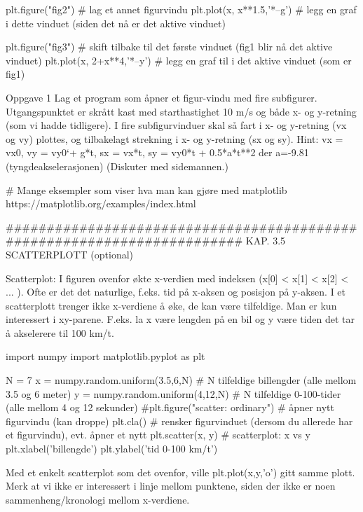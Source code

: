 \documentclass[a4paper,11pt,utf8]{book}
\begin{document}
plt.figure("fig2")                     # lag et annet figurvindu
plt.plot(x, x**1.5,'*--g')             # legg en graf i dette vinduet (siden det nå er det aktive vinduet)

plt.figure("fig3")                     # skift tilbake til det første vinduet (fig1 blir nå det aktive vinduet)
plt.plot(x, 2+x**4,'*--y')             # legg en graf til i det aktive vinduet (som er fig1)




Oppgave 1
Lag et program som åpner et figur-vindu med fire subfigurer.
Utgangspunktet er skrått kast med starthastighet 10 m/s og både x- og y-retning (som vi hadde tidligere).
I fire subfigurvinduer skal så fart i x- og y-retning (vx og vy) plottes,
og tilbakelagt strekning i x- og y-retning (sx og sy). 
Hint: vx = vx0, vy = vy0`+ g*t, sx = vx*t, sy = vy0*t + 0.5*a*t**2  der a=-9.81 (tyngdeakselerasjonen)
(Diskuter med sidemannen.) 



# Mange eksempler som viser hva man kan gjøre med matplotlib
https://matplotlib.org/examples/index.html


######################################################################## 
KAP. 3.5  SCATTERPLOTT  (optional)

Scatterplot:
I figuren ovenfor økte x-verdien med indeksen (x[0] < x[1] < x[2] < ... ). 
Ofte er det det naturlige, f.eks. tid på x-aksen og posisjon på y-aksen. 
I et scatterplott trenger ikke x-verdiene å øke, de kan være tilfeldige. 
Man er kun interessert i xy-parene. 
F.eks. la x være lengden på en bil og y være tiden det tar å akselerere til 100 km/t.

import numpy 
import matplotlib.pyplot as plt

N = 7
x = numpy.random.uniform(3.5,6,N)   # N tilfeldige billengder (alle mellom 3.5 og 6 meter)
y = numpy.random.uniform(4,12,N)    # N tilfeldige 0-100-tider (alle mellom 4 og 12 sekunder)
#plt.figure("scatter: ordinary")    # åpner nytt figurvindu  (kan droppe)
plt.cla()                           # rensker figurvinduet (dersom du allerede har et figurvindu), evt. åpner et nytt
plt.scatter(x, y)                   # scatterplot: x vs y
plt.xlabel('billengde')
plt.ylabel('tid 0-100 km/t')

Med et enkelt scatterplot som det ovenfor, ville plt.plot(x,y,'o') gitt samme plott. 
Merk at vi ikke er interessert i linje mellom punktene, siden der ikke er noen sammenheng/kronologi
mellom x-verdiene. 
\end{document}
